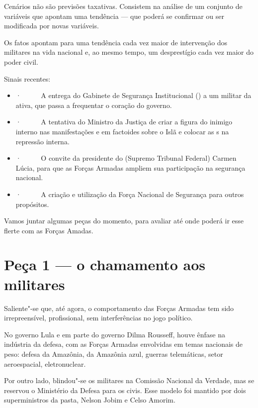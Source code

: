  

Cenários não são previsões taxativas. Consistem na análise de um
conjunto de variáveis que apontam uma tendência --- que poderá se
confirmar ou ser modificada por novas variáveis.

Os fatos apontam para uma tendência cada vez maior de intervenção dos
militares na vida nacional e, ao mesmo tempo, um desprestígio cada vez
maior do poder civil.

Sinais recentes:

\begin{itemize}
\itemsep1pt\parskip0pt
\item
  ·~~~~~ A entrega do Gabinete de Segurança Institucional () a um
  militar da ativa, que passa a frequentar o coração do governo.
\item
  ·~~~~~ A tentativa do Ministro da Justiça de criar a figura do inimigo
  interno nas manifestações e em factoides sobre o Islã e colocar as
  s na repressão interna.
\item
  ·~~~~~ O convite da presidente do  (Supremo Tribunal Federal)
  Carmen Lúcia, para que as Forças Armadas ampliem sua participação na
  segurança nacional.
\item
  ·~~~~~ A criação e utilização da Força Nacional de Segurança para
  outros propósitos.
\end{itemize}

Vamos juntar algumas peças do momento, para avaliar até onde poderá ir
esse flerte com as Forças Amadas.

\section{Peça 1 --- o chamamento aos militares}

Saliente"-se que, até agora, o comportamento das Forças Armadas tem sido
irrepreensível, profissional, sem interferências no jogo político.

No governo Lula e em parte do governo Dilma Rousseff, houve ênfase na
indústria da defesa, com as Forças Armadas envolvidas em temas nacionais
de peso: defesa da Amazônia, da Amazônia azul, guerras telemáticas,
setor aeroespacial, eletronuclear.

Por outro lado, blindou"-se os militares na Comissão Nacional da Verdade,
mas se reservou o Ministério da Defesa para os civis. Esse modelo foi
mantido por dois superministros da pasta, Nelson Jobim e Celso Amorim.


